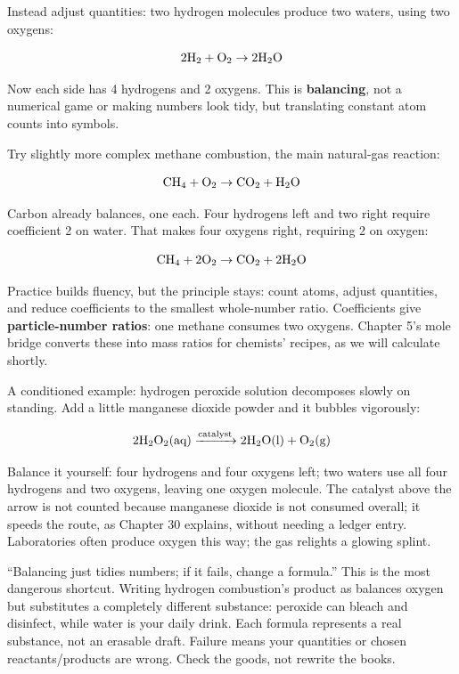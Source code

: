 Instead adjust quantities: two hydrogen molecules produce two waters, using two oxygens:

\[\mathrm{2H_2} + \mathrm{O_2} \rightarrow \mathrm{2H_2O}\]

Now each side has 4 hydrogens and 2 oxygens. This is \textbf{balancing}, not a numerical game or making numbers look tidy, but translating constant atom counts into symbols.

Try slightly more complex methane combustion, the main natural-gas reaction:

\[\mathrm{CH_4} + \mathrm{O_2} \rightarrow \mathrm{CO_2} + \mathrm{H_2O}\]

Carbon already balances, one each. Four hydrogens left and two right require coefficient 2 on water. That makes four oxygens right, requiring 2 on oxygen:

\[\mathrm{CH_4} + \mathrm{2O_2} \rightarrow \mathrm{CO_2} + \mathrm{2H_2O}\]

Practice builds fluency, but the principle stays: count atoms, adjust quantities, and reduce coefficients to the smallest whole-number ratio. Coefficients give \textbf{particle-number ratios}: one methane consumes two oxygens. Chapter 5's mole bridge converts these into mass ratios for chemists' recipes, as we will calculate shortly.

A conditioned example: hydrogen peroxide solution decomposes slowly on standing. Add a little manganese dioxide powder and it bubbles vigorously:

\[\mathrm{2H_2O_2(aq)} \xrightarrow{\text{catalyst}} \mathrm{2H_2O(l)} + \mathrm{O_2(g)}\]

Balance it yourself: four hydrogens and four oxygens left; two waters use all four hydrogens and two oxygens, leaving one oxygen molecule. The catalyst above the arrow is not counted because manganese dioxide is not consumed overall; it speeds the route, as Chapter 30 explains, without needing a ledger entry. Laboratories often produce oxygen this way; the gas relights a glowing splint.

\begin{wuqu}
``Balancing just tidies numbers; if it fails, change a formula.'' This is the most dangerous shortcut. Writing hydrogen combustion's product as  balances oxygen but substitutes a completely different substance: peroxide can bleach and disinfect, while water is your daily drink. Each formula represents a real substance, not an erasable draft. Failure means your quantities or chosen reactants/products are wrong. Check the goods, not rewrite the books.
\end{wuqu}

